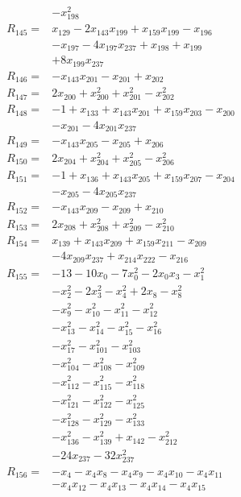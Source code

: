 \begin{align*}
&-x_{198}^{2}\\[3pt]
R_{145}={}&x_{129} -2x_{143}x_{199} +x_{159}x_{199} -x_{196}\\
&-x_{197} -4x_{197}x_{237} +x_{198} +x_{199}\\
&+8x_{199}x_{237}\\[3pt]
R_{146}={}&-x_{143}x_{201} -x_{201} +x_{202}\\[3pt]
R_{147}={}&2x_{200} +x_{200}^{2} +x_{201}^{2} -x_{202}^{2}\\[3pt]
R_{148}={}&-1 +x_{133} +x_{143}x_{201} +x_{159}x_{203} -x_{200}\\
&-x_{201} -4x_{201}x_{237}\\[3pt]
R_{149}={}&-x_{143}x_{205} -x_{205} +x_{206}\\[3pt]
R_{150}={}&2x_{204} +x_{204}^{2} +x_{205}^{2} -x_{206}^{2}\\[3pt]
R_{151}={}&-1 +x_{136} +x_{143}x_{205} +x_{159}x_{207} -x_{204}\\
&-x_{205} -4x_{205}x_{237}\\[3pt]
R_{152}={}&-x_{143}x_{209} -x_{209} +x_{210}\\[3pt]
R_{153}={}&2x_{208} +x_{208}^{2} +x_{209}^{2} -x_{210}^{2}\\[3pt]
R_{154}={}&x_{139} +x_{143}x_{209} +x_{159}x_{211} -x_{209}\\
&-4x_{209}x_{237} +x_{214}x_{222} -x_{216}\\[3pt]
R_{155}={}&-13 -10x_{0} -7x_{0}^{2} -2x_{0}x_{3} -x_{1}^{2}\\
&-x_{2}^{2} -2x_{3}^{2} -x_{4}^{2} +2x_{8} -x_{8}^{2}\\
&-x_{9}^{2} -x_{10}^{2} -x_{11}^{2} -x_{12}^{2}\\
&-x_{13}^{2} -x_{14}^{2} -x_{15}^{2} -x_{16}^{2}\\
&-x_{17}^{2} -x_{101}^{2} -x_{103}^{2}\\
&-x_{104}^{2} -x_{108}^{2} -x_{109}^{2}\\
&-x_{112}^{2} -x_{115}^{2} -x_{118}^{2}\\
&-x_{121}^{2} -x_{122}^{2} -x_{125}^{2}\\
&-x_{128}^{2} -x_{129}^{2} -x_{133}^{2}\\
&-x_{136}^{2} -x_{139}^{2} +x_{142} -x_{212}^{2}\\
&-24x_{237} -32x_{237}^{2}\\[3pt]
R_{156}={}&-x_{4} -x_{4}x_{8} -x_{4}x_{9} -x_{4}x_{10} -x_{4}x_{11}\\
&-x_{4}x_{12} -x_{4}x_{13} -x_{4}x_{14} -x_{4}x_{15}\\

\end{align*}
